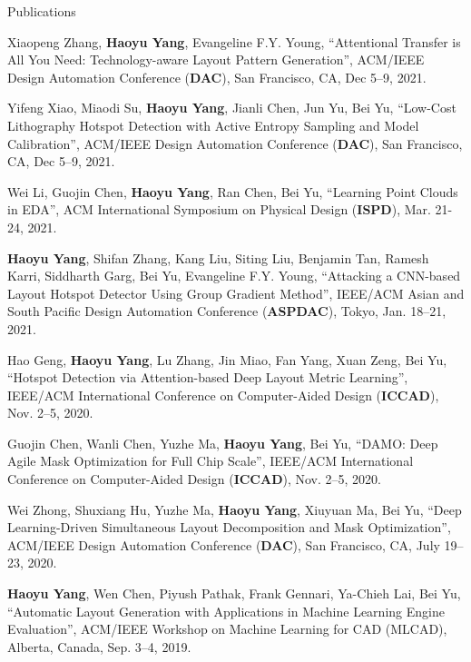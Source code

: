 \begin{rSection}{Publications}
\begin{description}[font=\normalfont]
	\item[{[C21]}] Xiaopeng Zhang, \textbf{Haoyu Yang}, Evangeline F.Y. Young, ``Attentional Transfer is All You Need: Technology-aware Layout Pattern Generation'',
	ACM/IEEE Design Automation Conference (\textbf{DAC}), San Francisco, CA, Dec 5–9, 2021.
	
	
	\item[{[C20]}] Yifeng Xiao, Miaodi Su, \textbf{Haoyu Yang}, Jianli Chen, Jun Yu, Bei Yu,
	``Low-Cost Lithography Hotspot Detection with Active Entropy Sampling and Model Calibration'',
	ACM/IEEE Design Automation Conference (\textbf{DAC}), San Francisco, CA, Dec 5–9, 2021.
	
	\item[{[C19]}] Wei Li, Guojin Chen, \textbf{Haoyu Yang}, Ran Chen, Bei Yu,
	``Learning Point Clouds in EDA'', ACM International Symposium on Physical Design (\textbf{ISPD}), Mar. 21-24, 2021.

	\item[{[C18]}] \textbf{Haoyu Yang}, Shifan Zhang, Kang Liu, Siting Liu, Benjamin Tan, Ramesh Karri, Siddharth Garg, Bei Yu, Evangeline F.Y. Young,
	``Attacking a CNN-based Layout Hotspot Detector Using Group Gradient Method'', 
	IEEE/ACM Asian and South Pacific Design Automation Conference (\textbf{ASPDAC}), Tokyo, Jan. 18–21, 2021.

    \item[{[C17]}] Hao Geng, \textbf{Haoyu Yang}, Lu Zhang, Jin Miao, Fan Yang, Xuan Zeng, Bei Yu, 
    ``Hotspot Detection via Attention-based Deep Layout Metric Learning'', 
    IEEE/ACM International Conference on Computer-Aided Design (\textbf{ICCAD}), Nov. 2–5, 2020.
    
    \item[{[C16]}] Guojin Chen, Wanli Chen, Yuzhe Ma, \textbf{Haoyu Yang}, Bei Yu,
     ``DAMO: Deep Agile Mask Optimization for Full Chip Scale'', 
     IEEE/ACM International Conference on Computer-Aided Design (\textbf{ICCAD}), Nov. 2–5, 2020.
	
	\item[{[C15]}] Wei Zhong, Shuxiang Hu, Yuzhe Ma, \textbf{Haoyu Yang}, Xiuyuan Ma, Bei Yu, 
	``Deep Learning-Driven Simultaneous Layout Decomposition and Mask Optimization'', 
	ACM/IEEE Design Automation Conference (\textbf{DAC}), San Francisco, CA, July 19–23, 2020.
	
	\item[{[C14]}] \textbf{Haoyu Yang}, Wen Chen, Piyush Pathak, Frank Gennari, Ya-Chieh Lai, Bei Yu, 
	``Automatic Layout Generation with Applications in Machine Learning Engine Evaluation'', 
	ACM/IEEE Workshop on Machine Learning for CAD (MLCAD), Alberta, Canada, Sep. 3–4, 2019.
	

\end{description}
\end{rSection}
